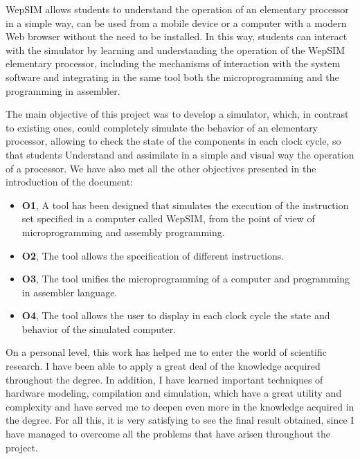 WepSIM allows students to understand the operation of an elementary processor in a simple way, can be used from a mobile device or a computer with a modern Web browser without the need to be installed. In this way, students can interact with the simulator by learning and understanding the operation of the WepSIM elementary processor, including the mechanisms of interaction with the system software and integrating in the same tool both the microprogramming and the programming in assembler.

The main objective of this project was to develop a simulator, which, in contrast to existing ones, could completely simulate the behavior of an elementary processor, allowing to check the state of the components in each clock cycle, so that students Understand and assimilate in a simple and visual way the operation of a processor. We have also met all the other objectives presented in the introduction of the document:

\begin{itemize}

\item \textbf{O1}, A tool has been designed that simulates the execution of the instruction set specified in a computer called WepSIM, from the point of view of microprogramming and assembly programming.

\item \textbf{O2}, The tool allows the specification of different instructions.

\item \textbf{O3}, The tool unifies the microprogramming of a computer and programming in assembler language.

\item \textbf{O4}, The tool allows the user to display in each clock cycle the state and behavior of the simulated computer.

\end{itemize}

On a personal level, this work has helped me to enter the world of scientific research. I have been able to apply a great deal of the knowledge acquired throughout the degree. In addition, I have learned important techniques of hardware modeling, compilation and simulation, which have a great utility and complexity and have served me to deepen even more in the knowledge acquired in the degree. For all this, it is very satisfying to see the final result obtained, since I have managed to overcome all the problems that have arisen throughout the project.

